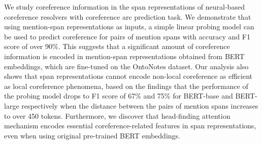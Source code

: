 \documentclass[11pt]{article}
\begin{document}
 




We study coreference information in the span representations of neural-based coreference resolvers with coreference arc prediction task. We demonstrate that using mention-span representations as inputs, a simple linear probing model can be used to predict coreference for pairs of mention spans with accuracy and F1 score of over 90\%. This suggests that a significant amount of coreference information is encoded in mention-span representations obtained from BERT embeddings, which are fine-tuned on the OntoNotes dataset. Our analysis also shows that span representations cannot encode non-local coreference as efficient as local coreference phenomena, based on the findings that the performance of the probing model drops to F1 score of 67\% and 75\% for BERT-base and BERT-large respectively when the distance between the pairs of mention spans increases to over 450 tokens. Furthermore, we discover that head-finding attention mechanism encodes essential coreference-related features in span representations, even when using original pre-trained BERT embeddings.
\end{document}
